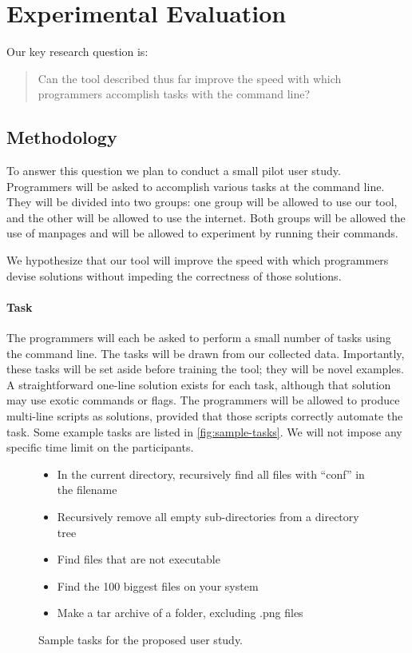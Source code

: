 \section{Experimental Evaluation}

Our key research question is:
%
\begin{quote}
    Can the tool described thus far improve the speed with which programmers
    accomplish tasks with the command line?
\end{quote}

\subsection{Methodology}

To answer this question we plan to conduct a small pilot user study. Programmers
will be asked to accomplish various tasks at the command line. They will be
divided into two groups: one group will be allowed to use our tool, and the
other will be allowed to use the internet. Both groups will be allowed the use
of manpages and will be allowed to experiment by running their commands.

We hypothesize that our tool will improve the speed with which programmers
devise solutions without impeding the correctness of those solutions.

\paragraph{Task} The programmers will each be asked to perform a small number of
tasks using the command line. The tasks will be drawn from our collected data.
Importantly, these tasks will be set aside before training the tool; they will
be novel examples.
A straightforward one-line solution exists for each task, although that solution
may use exotic commands or flags. The programmers will be allowed to produce
multi-line scripts as solutions, provided that those scripts correctly
automate the task. Some example tasks are listed in \autoref{fig:sample-tasks}.
We will not impose any specific time limit on the participants.

\begin{figure}[ht]
    \begin{framed}
    \begin{itemize}\itemsep-1pt
        \item In the current directory, recursively find all files with ``conf''
            in the filename
        \item Recursively remove all empty sub-directories from a directory tree
        \item Find files that are not executable
        \item Find the 100 biggest files on your system
        \item Make a tar archive of a folder, excluding .png files
    \end{itemize}
    \end{framed}
    \caption{Sample tasks for the proposed user study.}
    \vspace{-10pt}
    \label{fig:sample-tasks}
\end{figure}

